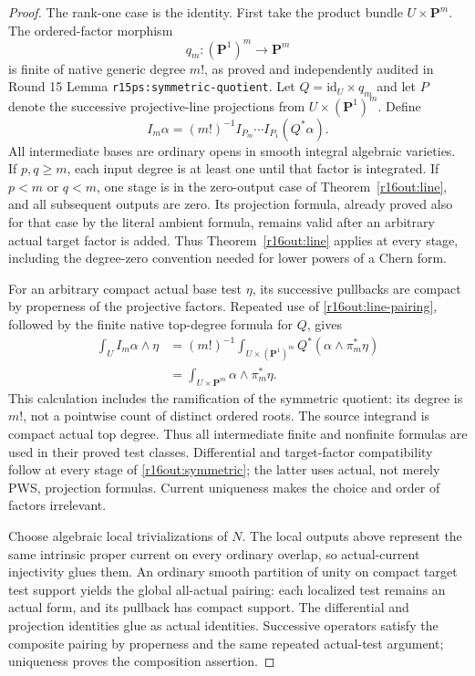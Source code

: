 \begin{proof}
The rank-one case is the identity.  First take the product bundle
$U\times\mathbf P^m$.  The ordered-factor morphism
\[
 q_m:(\mathbf P^1)^m\longrightarrow\mathbf P^m
\]
is finite of native generic degree $m!$, as proved and independently
audited in Round 15 Lemma \texttt{r15ps:symmetric-quotient}.
Let $Q=\mathrm{id}_U\times q_m$ and let $P$ denote the successive
projective-line projections from $U\times(\mathbf P^1)^m$.
Define
\[
 I_m\alpha=(m!)^{-1}I_{P_m}\cdots I_{P_1}(Q^*\alpha).
 \tag{OUT16.12}\label{r16out:symmetric}
\]
All intermediate bases are ordinary opens in smooth integral
algebraic varieties.  If $p,q\geq m$, each input degree is at least
one until that factor is integrated.  If $p<m$ or $q<m$, one stage
is in the zero-output case of Theorem~\ref{r16out:line}, and all
subsequent outputs are zero.  Its projection formula, already
proved also for that case by the literal ambient formula, remains
valid after an arbitrary actual target factor is added.  Thus
Theorem~\ref{r16out:line} applies at every stage, including the
degree-zero convention needed for lower powers of a Chern form.

For an arbitrary compact actual base test $\eta$, its successive
pullbacks are compact by properness of the projective factors.
Repeated use of \eqref{r16out:line-pairing}, followed by the finite
native top-degree formula for $Q$, gives
\[
\begin{split}
 \int_U I_m\alpha\wedge\eta
  &=(m!)^{-1}\int_{U\times(\mathbf P^1)^m}
             Q^*(\alpha\wedge\pi_m^*\eta)\\
  &=\int_{U\times\mathbf P^m}\alpha\wedge\pi_m^*\eta.
\end{split}
 \tag{OUT16.13}\label{r16out:symmetric-pairing}
\]
This calculation includes the ramification of the symmetric quotient:
its degree is $m!$, not a pointwise count of distinct ordered roots.
The source integrand is compact actual top degree.  Thus all
intermediate finite and nonfinite formulas are used in their proved
test classes.  Differential and target-factor compatibility follow
at every stage of \eqref{r16out:symmetric}; the latter uses actual,
not merely PWS, projection formulas.  Current uniqueness makes the
choice and order of factors irrelevant.

Choose algebraic local trivializations of $N$.  The local outputs
above represent the same intrinsic proper current on every ordinary
overlap, so actual-current injectivity glues them.  An ordinary smooth
partition of unity on compact target test support yields the global
all-actual pairing: each localized test remains an actual form, and
its pullback has compact support.  The differential and projection
identities glue as actual identities.  Successive operators satisfy
the composite pairing by properness and the same repeated actual-test
argument; uniqueness proves the composition assertion.
\end{proof}

